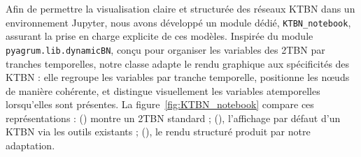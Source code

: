 \documentclass{article}
\begin{document}
Afin de permettre la visualisation claire et structurée des réseaux KTBN dans un environnement Jupyter, nous avons
développé un module dédié, \texttt{KTBN\_notebook}, assurant la prise en charge explicite de ces modèles.
Inspirée du module \texttt{pyagrum.lib.dynamicBN}, conçu pour organiser les variables des 2TBN par tranches temporelles,
notre classe adapte le rendu graphique aux spécificités des KTBN : elle regroupe les variables par tranche temporelle,
positionne les nœuds de manière cohérente, et distingue visuellement les variables atemporelles lorsqu'elles sont
présentes. La figure~\ref{fig:KTBN_notebook} compare ces représentations : () montre un 2TBN
standard ; (), l'affichage par défaut d'un KTBN via les outils existants ;
(), le rendu structuré produit par notre adaptation.
\end{document}
